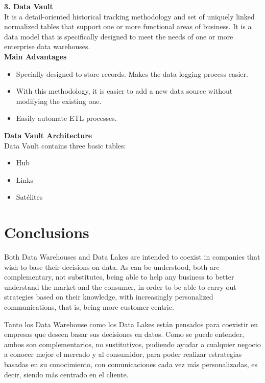 \documentclass[twocolumn]{article}
\begin{document}
\noindent\textbf{\large 3. Data Vault}\\[0.1in]
It is a detail-oriented historical tracking methodology and set of uniquely linked normalized tables that support one or more functional areas of business. It is a data model that is specifically designed to meet the needs of one or more enterprise data warehouses.\\[0.1in]
\textbf{Main Advantages}
\begin{itemize}
    \item Specially designed to store records. Makes the data logging process easier.
    \item With this methodology, it is easier to add a new data source without modifying the existing one.
    \item Easily automate ETL processes.
\end{itemize}
\textbf{Data Vault Architecture}\\[0.1in]
Data Vault contains three basic tables:
\begin{itemize}
    \item Hub
    \item Links
    \item Satélites
\end{itemize}
\section{Conclusions}

\noindent Both Data Warehouses and Data Lakes are intended to coexist in companies that wish to base their decisions on data. As can be understood, both are complementary, not substitutes, being able to help any business to better understand the market and the consumer, in order to be able to carry out strategies based on their knowledge, with increasingly personalized communications, that is, being more customer-centric.

\vspace{0.5cm}

 \noindent Tanto los Data Warehouse como los Data Lakes están pensados para coexistir en empresas que deseen basar sus decisiones en datos. Como se puede entender, ambos son complementarios, no sustitutivos, pudiendo ayudar a cualquier negocio a conocer mejor el mercado y al consumidor, para poder realizar estrategias basadas en su conocimiento, con comunicaciones cada vez más personalizadas, es decir, siendo más centrado en el cliente.
\end{document}
